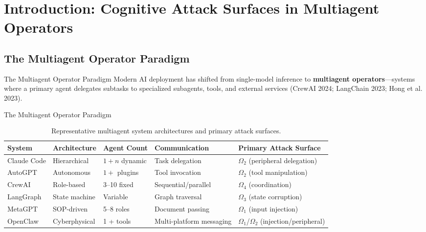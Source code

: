 \documentclass[
  ignorenonframetext,
]{beamer}
\author{\texorpdfstring{}{}}
\date{}
\begin{document}
\begin{frame}
\newpage
\end{frame}

\section{Introduction: Cognitive Attack Surfaces in Multiagent
Operators}\label{introduction-cognitive-attack-surfaces-in-multiagent-operators}

\subsection{The Multiagent Operator Paradigm}\label{sec:paradigm}

\begin{frame}[allowframebreaks]{The Multiagent Operator Paradigm}
Modern AI deployment has shifted from single-model inference to
\textbf{multiagent operators}---systems where a primary agent delegates
subtasks to specialized subagents, tools, and external services (CrewAI
2024; LangChain 2023; {Hong et al.} 2023).

\end{frame}

\begin{frame}[allowframebreaks]{The Multiagent Operator Paradigm}
\begin{table}[htbp]
\centering
\caption{Representative multiagent system architectures and primary attack surfaces.}
\label{tab:architectures}
\begin{tabular}{@{}lllll@{}}
\toprule
System & Architecture & Agent Count & Communication & Primary Attack Surface \\
\midrule
Claude Code & Hierarchical & $1 + n$ dynamic & Task delegation & $\Omega_2$ (peripheral delegation) \\
AutoGPT & Autonomous & $1 +$ plugins & Tool invocation & $\Omega_2$ (tool manipulation) \\
CrewAI & Role-based & 3--10 fixed & Sequential/parallel & $\Omega_4$ (coordination) \\
LangGraph & State machine & Variable & Graph traversal & $\Omega_3$ (state corruption) \\
MetaGPT & SOP-driven & 5--8 roles & Document passing & $\Omega_1$ (input injection) \\
OpenClaw & Cyberphysical & 1 + tools & Multi-platform messaging & $\Omega_1$/$\Omega_2$ (injection/peripheral) \\
\bottomrule
\end{tabular}
\end{table}

\end{frame}
\end{document}
